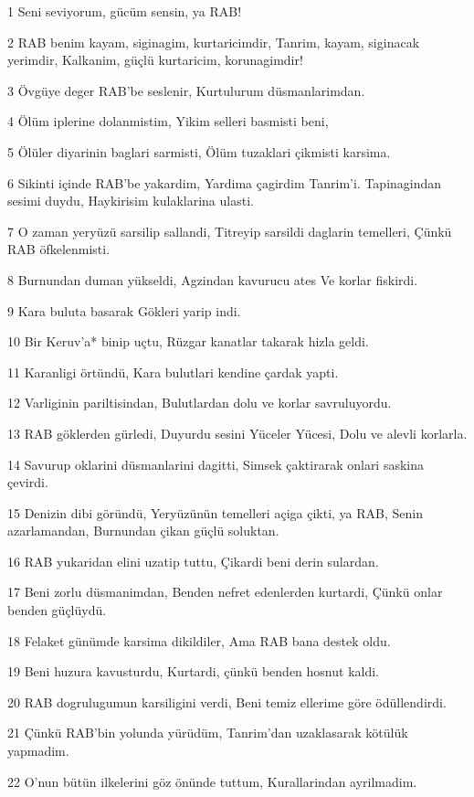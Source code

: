 \par 1 Seni seviyorum, gücüm sensin, ya RAB!
\par 2 RAB benim kayam, siginagim, kurtaricimdir, Tanrim, kayam, siginacak yerimdir, Kalkanim, güçlü kurtaricim, korunagimdir!
\par 3 Övgüye deger RAB'be seslenir, Kurtulurum düsmanlarimdan.
\par 4 Ölüm iplerine dolanmistim, Yikim selleri basmisti beni,
\par 5 Ölüler diyarinin baglari sarmisti, Ölüm tuzaklari çikmisti karsima.
\par 6 Sikinti içinde RAB'be yakardim, Yardima çagirdim Tanrim'i. Tapinagindan sesimi duydu, Haykirisim kulaklarina ulasti.
\par 7 O zaman yeryüzü sarsilip sallandi, Titreyip sarsildi daglarin temelleri, Çünkü RAB öfkelenmisti.
\par 8 Burnundan duman yükseldi, Agzindan kavurucu ates Ve korlar fiskirdi.
\par 9 Kara buluta basarak Gökleri yarip indi.
\par 10 Bir Keruv'a* binip uçtu, Rüzgar kanatlar takarak hizla geldi.
\par 11 Karanligi örtündü, Kara bulutlari kendine çardak yapti.
\par 12 Varliginin pariltisindan, Bulutlardan dolu ve korlar savruluyordu.
\par 13 RAB göklerden gürledi, Duyurdu sesini Yüceler Yücesi, Dolu ve alevli korlarla.
\par 14 Savurup oklarini düsmanlarini dagitti, Simsek çaktirarak onlari saskina çevirdi.
\par 15 Denizin dibi göründü, Yeryüzünün temelleri açiga çikti, ya RAB, Senin azarlamandan, Burnundan çikan güçlü soluktan.
\par 16 RAB yukaridan elini uzatip tuttu, Çikardi beni derin sulardan.
\par 17 Beni zorlu düsmanimdan, Benden nefret edenlerden kurtardi, Çünkü onlar benden güçlüydü.
\par 18 Felaket günümde karsima dikildiler, Ama RAB bana destek oldu.
\par 19 Beni huzura kavusturdu, Kurtardi, çünkü benden hosnut kaldi.
\par 20 RAB dogrulugumun karsiligini verdi, Beni temiz ellerime göre ödüllendirdi.
\par 21 Çünkü RAB'bin yolunda yürüdüm, Tanrim'dan uzaklasarak kötülük yapmadim.
\par 22 O'nun bütün ilkelerini göz önünde tuttum, Kurallarindan ayrilmadim.

